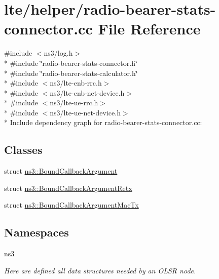 \hypertarget{radio-bearer-stats-connector_8cc}{}\section{lte/helper/radio-\/bearer-\/stats-\/connector.cc File Reference}
\label{radio-bearer-stats-connector_8cc}
{\ttfamily \#include $<$ns3/log.\+h$>$}\\*
{\ttfamily \#include \char`\"{}radio-\/bearer-\/stats-\/connector.\+h\char`\"{}}\\*
{\ttfamily \#include \char`\"{}radio-\/bearer-\/stats-\/calculator.\+h\char`\"{}}\\*
{\ttfamily \#include $<$ns3/lte-\/enb-\/rrc.\+h$>$}\\*
{\ttfamily \#include $<$ns3/lte-\/enb-\/net-\/device.\+h$>$}\\*
{\ttfamily \#include $<$ns3/lte-\/ue-\/rrc.\+h$>$}\\*
{\ttfamily \#include $<$ns3/lte-\/ue-\/net-\/device.\+h$>$}\\*
Include dependency graph for radio-\/bearer-\/stats-\/connector.cc\+:
\subsection*{Classes}
\begin{DoxyCompactItemize}
\item 
struct \hyperlink{structns3_1_1BoundCallbackArgument}{ns3\+::\+Bound\+Callback\+Argument}
\item 
struct \hyperlink{structns3_1_1BoundCallbackArgumentRetx}{ns3\+::\+Bound\+Callback\+Argument\+Retx}
\item 
struct \hyperlink{structns3_1_1BoundCallbackArgumentMacTx}{ns3\+::\+Bound\+Callback\+Argument\+Mac\+Tx}
\end{DoxyCompactItemize}
\subsection*{Namespaces}
\begin{DoxyCompactItemize}
\item 
 \hyperlink{namespacens3}{ns3}
\begin{DoxyCompactList}\small\item\em Here are defined all data structures needed by an O\+L\+SR node. \end{DoxyCompactList}\end{DoxyCompactItemize}
